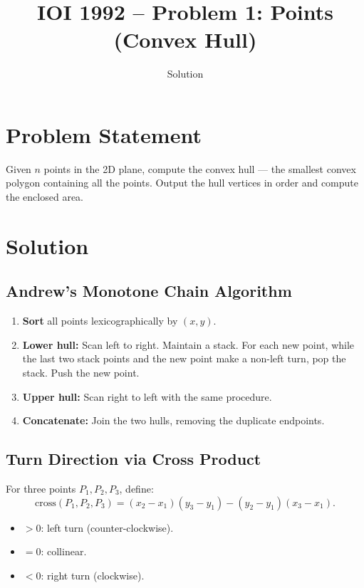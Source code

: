 \documentclass[11pt,a4paper]{article}
\title{IOI 1992 -- Problem 1: Points (Convex Hull)}
\author{Solution}
\date{}
\begin{document}
\maketitle

\section{Problem Statement}

Given $n$ points in the 2D plane, compute the convex hull --- the smallest
convex polygon containing all the points. Output the hull vertices in order
and compute the enclosed area.

\section{Solution}

\subsection{Andrew's Monotone Chain Algorithm}

\begin{enumerate}
  \item \textbf{Sort} all points lexicographically by $(x, y)$.
  \item \textbf{Lower hull:} Scan left to right. Maintain a stack. For each
    new point, while the last two stack points and the new point make a
    non-left turn, pop the stack. Push the new point.
  \item \textbf{Upper hull:} Scan right to left with the same procedure.
  \item \textbf{Concatenate:} Join the two hulls, removing the duplicate
    endpoints.
\end{enumerate}

\subsection{Turn Direction via Cross Product}

For three points $P_1, P_2, P_3$, define:
\[
  \text{cross}(P_1, P_2, P_3)
  = (x_2 - x_1)(y_3 - y_1) - (y_2 - y_1)(x_3 - x_1).
\]
\begin{itemize}
  \item $> 0$: left turn (counter-clockwise).
  \item $= 0$: collinear.
  \item $< 0$: right turn (clockwise).
\end{itemize}
\end{document}
